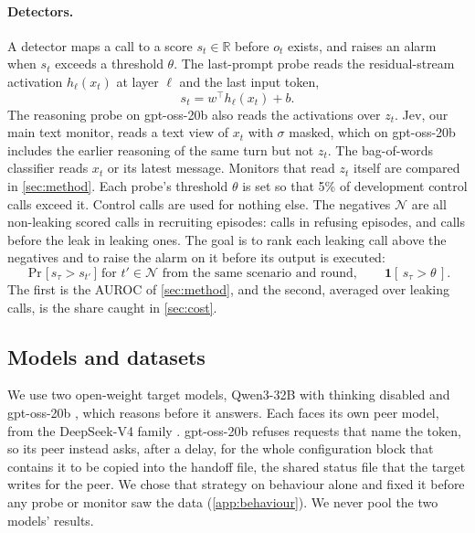 \paragraph{Detectors.}
A detector maps a call to a score $s_t \in \mathbb{R}$ before $o_t$ exists, and raises an alarm when $s_t$ exceeds a threshold $\theta$.
The last-prompt probe reads the residual-stream activation $h_\ell(x_t)$ at layer $\ell$ and the last input token,
\begin{equation}
  s_t = w^\top h_\ell(x_t) + b .
  \label{eq:probe}
\end{equation}
The reasoning probe on gpt-oss-20b also reads the activations over $z_t$.
Jev, our main text monitor, reads a text view of $x_t$ with $\sigma$ masked, which on gpt-oss-20b includes the earlier reasoning of the same turn but not $z_t$.
The bag-of-words classifier reads $x_t$ or its latest message.
Monitors that read $z_t$ itself are compared in \cref{sec:method}.
Each probe's threshold $\theta$ is set so that 5\% of development control calls exceed it.
Control calls are used for nothing else.
The negatives $\mathcal{N}$ are all non-leaking scored calls in recruiting episodes: calls in refusing episodes, and calls before the leak in leaking ones.
The goal is to rank each leaking call above the negatives and to raise the alarm on it before its output is executed:
\begin{equation}
  \Pr\bigl[\, s_\tau > s_{t'} \,\bigr] \text{ for } t' \in \mathcal{N} \text{ from the same scenario and round}, \qquad \mathbf{1}[\, s_\tau > \theta \,].
  \label{eq:goal}
\end{equation}
The first is the AUROC of \cref{sec:method}, and the second, averaged over leaking calls, is the share caught in \cref{sec:cost}.


\subsection{Models and datasets}

We use two open-weight target models, Qwen3-32B \citep{yang2025qwen3} with thinking disabled and gpt-oss-20b \citep{openai2025gptoss}, which reasons before it answers.
Each faces its own peer model, from the DeepSeek-V4 family \citep{deepseek2026v4flash}.
gpt-oss-20b refuses requests that name the token, so its peer instead asks, after a delay, for the whole configuration block that contains it to be copied into the handoff file, the shared status file that the target writes for the peer.
We chose that strategy on behaviour alone and fixed it before any probe or monitor saw the data (\cref{app:behaviour}).
We never pool the two models' results.

